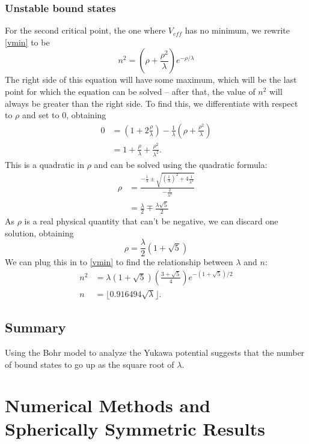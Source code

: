 \documentclass[12pt,twoside]{reedthesis}
\begin{document}
\subsection{Unstable bound states}
For the second critical point, the one where $V_{eff}$ has no minimum, we rewrite \eqref{vmin} to be
\begin{equation}
n^2 = \left( \rho + \frac{\rho^2}{\lambda} \right) e^{-\rho/\lambda}
\end{equation}
The right side of this equation will have some maximum, which will be the last point for which the equation can be solved -- after that, the value of $n^2$ will always be greater than the right side. To find this, we differentiate with respect to $\rho$ and set to 0, obtaining
\begin{align}
0 &= (1+2 \frac{\rho}{\lambda}) - \frac{1}{\lambda}(\rho + \frac{\rho^2}{\lambda}) \\
&= 1 + \frac{\rho}{\lambda} + \frac{\rho^2}{\lambda^2}\mbox{.}
\end{align}
This is a quadratic in $\rho$ and can be solved using the quadratic formula:
\begin{align}
\rho &= \frac{-\frac{1}{\lambda} \pm \sqrt{\left(\frac{1}{\lambda}\right)^2+4\frac{1}{\lambda^2}}}{-\frac{2}{\lambda^2}} \\
&= \frac{\lambda}{2} \mp \frac{\lambda \sqrt{5}}{2}
\end{align}
As $\rho$ is a real physical quantity that can't be negative, we can discard one solution, obtaining
\begin{equation}
\rho = \frac{\lambda}{2}(1+\sqrt{5})
\end{equation}
We can plug this in to \eqref{vmin} to find the relationship between $\lambda$ and $n$:
\begin{align}
n^2 &= \lambda(1+\sqrt{5})\left(\frac{3+\sqrt{5}}{4}\right)e^{-(1+\sqrt{5})/2} \\
n &= \lfloor 0.916494 \sqrt{\lambda} \rfloor \mbox{.}
\end{align}
\section{Summary}
Using the Bohr model to analyze the Yukawa potential suggests that the number of bound states to go up as the square root of $\lambda$.

\clearpage %

\chapter{Numerical Methods and Spherically Symmetric Results}
\end{document}
